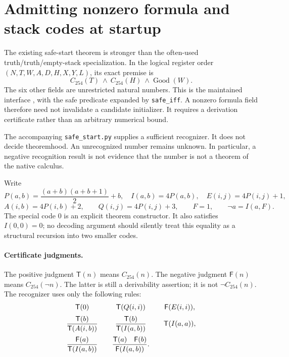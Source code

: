 \section{Admitting nonzero formula and stack codes at startup}
\label{sec:expanded-safe-roots}

The existing safe-start theorem is stronger than the often-used
truth/truth/empty-stack specialization.  In the logical register order
$(N,T,W,A,D,H,X,Y,L)$, its exact premise is
\[
 C_{254}(T)\ \wedge\ C_{254}(H)\ \wedge\operatorname{Good}(W).
\]
The six other fields are unrestricted natural numbers.  This is the
maintained interface
,
with the safe predicate expanded by \texttt{safe\_iff}.  A nonzero formula
field therefore need not invalidate a candidate initializer.  It requires
a derivation certificate rather than an arbitrary numerical bound.

The accompanying \texttt{safe\_start.py} supplies a sufficient recognizer.
It does not decide theoremhood.  An unrecognized number remains unknown.
In particular, a negative recognition result is not evidence that the
number is not a theorem of the native calculus.

Write
\[
 P(a,b)=\frac{(a+b)(a+b+1)}2+b,\quad
 I(a,b)=4P(a,b),\quad
 E(i,j)=4P(i,j)+1,
\]
\[
 A(i,b)=4P(i,b)+2,\qquad Q(i,j)=4P(i,j)+3,
 \qquad F=1,\qquad\neg a=I(a,F).
\]
The special code $0$ is an explicit theorem constructor.  It also satisfies
$I(0,0)=0$; no decoding argument should silently treat this equality as a
structural recursion into two smaller codes.

\paragraph{Certificate judgments.}
The positive judgment $\mathsf T(n)$ means $C_{254}(n)$.
The negative judgment $\mathsf F(n)$ means $C_{254}(\neg n)$.
The latter is still a derivability assertion; it is not
$\neg C_{254}(n)$.  The recognizer uses only the following rules:
\[
\begin{array}{c@{\qquad}c@{\qquad}c}
\mathsf T(0)&\mathsf T(Q(i,i))&\mathsf F(E(i,i)),\\[2mm]
\dfrac{\mathsf T(b)}{\mathsf T(A(i,b))}&
\dfrac{\mathsf T(b)}{\mathsf T(I(a,b))}&
\mathsf T(I(a,a)),\\[4mm]
\dfrac{\mathsf F(a)}{\mathsf T(I(a,b))}&
\dfrac{\mathsf T(a)\quad\mathsf F(b)}{\mathsf F(I(a,b))}.&
\end{array}
\]

